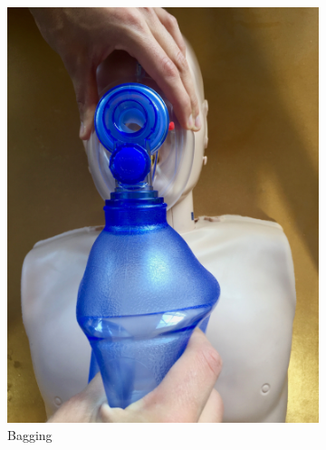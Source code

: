 \begin{figure}
\begin{subfigure}[b]{0.18\textwidth}
 		\includegraphics[width=\textwidth]{pictures/bagging}
 		\caption{Bagging}
 		\label{fig:bagging}
 	\end{subfigure}
 	~ %
 	\begin{subfigure}[b]{0.18\textwidth}

\end{subfigure}
\end{figure}
